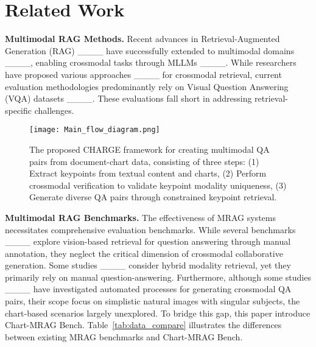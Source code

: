 \section{Related Work}
\noindent \textbf{Multimodal RAG Methods.} Recent advances in Retrieval-Augmented Generation (RAG) ____ have successfully extended to multimodal domains ____, enabling crossmodal tasks through MLLMs ____. While researchers have proposed various approaches ____ for crossmodal retrieval, current evaluation methodologies predominantly rely on Visual Question Answering (VQA) datasets ____. These evaluations fall short in addressing retrieval-specific challenges.

\begin{figure*}[th]
  \texttt{[image: Main\_flow\_diagram.png]}
  \caption{The proposed CHARGE framework for creating multimodal QA pairs from document-chart data, consisting of three steps: (1) Extract keypoints from textual content and charts, (2) Perform crossmodal verification to validate keypoint modality uniqueness, (3) Generate diverse QA pairs through constrained keypoint retrieval.}
  \label{Main_flow_diagram}
\end{figure*}

\noindent \textbf{Multimodal RAG Benchmarks.} The effectiveness of MRAG systems necessitates comprehensive evaluation benchmarks. While several benchmarks ____ explore vision-based retrieval for question answering through manual annotation, they neglect the critical dimension of crossmodal collaborative generation. Some studies ____ consider hybrid modality retrieval, yet they primarily rely on manual question-answering. Furthermore, although some studies ____ have investigated automated processes for generating crossmodal QA pairs, their scope focus on simplistic natural images with singular subjects, the chart-based scenarios largely unexplored. To bridge this gap, this paper introduce Chart-MRAG Bench. Table~\ref{tab:data_compare} illustrates the differences between existing MRAG benchmarks and Chart-MRAG Bench.